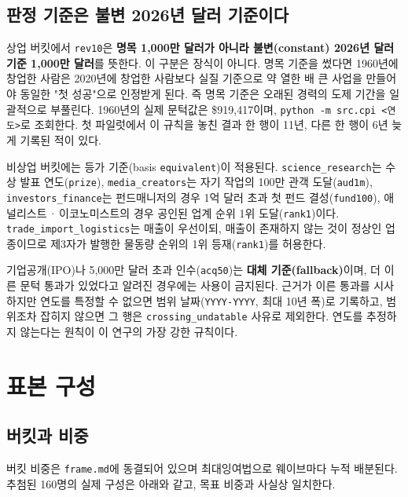 \documentclass[11pt]{article}
\begin{document}
\subsection{판정 기준은 불변 2026년 달러 기준이다}

상업 버킷에서 \texttt{rev10}은 \textbf{명목 1{,}000만 달러가 아니라
불변(constant) 2026년 달러 기준 1{,}000만 달러}를 뜻한다. 이 구분은 장식이 아니다.
명목 기준을 썼다면 1960년에 창업한 사람은 2020년에 창업한 사람보다
실질 기준으로 약 열한 배 큰 사업을 만들어야 동일한 "첫 성공"으로 인정받게 된다.
즉 명목 기준은 오래된 경력의 도제 기간을 일괄적으로 부풀린다.
1960년의 실제 문턱값은 \$919{,}417이며, \texttt{python -m src.cpi \textless{}연도\textgreater{}}로 조회한다.
첫 파일럿에서 이 규칙을 놓친 결과 한 행이 11년, 다른 한 행이 6년 늦게 기록된 적이 있다.

비상업 버킷에는 등가 기준(basis \texttt{equivalent})이 적용된다.
\texttt{science\_research}는 수상 발표 연도(\texttt{prize}),
\texttt{media\_creators}는 자기 작업의 100만 관객 도달(\texttt{aud1m}),
\texttt{investors\_finance}는 펀드매니저의 경우 1억 달러 초과 첫 펀드 결성(\texttt{fund100}),
애널리스트\,·\,이코노미스트의 경우 공인된 업계 순위 1위 도달(\texttt{rank1})이다.
\texttt{trade\_import\_logistics}는 매출이 우선이되, 매출이 존재하지 않는 것이 정상인 업종이므로
제3자가 발행한 물동량 순위의 1위 등재(\texttt{rank1})를 허용한다.

기업공개(IPO)나 5{,}000만 달러 초과 인수(\texttt{acq50})는 \textbf{대체 기준(fallback)}이며,
더 이른 문턱 통과가 있었다고 알려진 경우에는 사용이 금지된다.
근거가 이른 통과를 시사하지만 연도를 특정할 수 없으면 범위 날짜(\texttt{YYYY-YYYY}, 최대 10년 폭)로 기록하고,
범위조차 잡히지 않으면 그 행은 \texttt{crossing\_undatable} 사유로 제외한다.
연도를 추정하지 않는다는 원칙이 이 연구의 가장 강한 규칙이다.

\section{표본 구성}

\subsection{버킷과 비중}

버킷 비중은 \texttt{frame.md}에 동결되어 있으며 최대잉여법으로 웨이브마다 누적 배분된다.
추첨된 160명의 실제 구성은 아래와 같고, 목표 비중과 사실상 일치한다.
\end{document}
